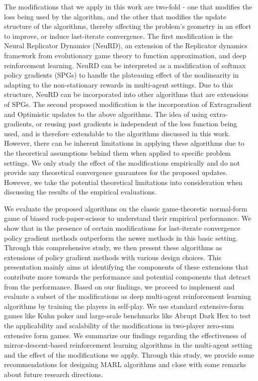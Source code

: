 The modifications that we apply in this work are two-fold - one that modifies the loss being used
by the algorithm, and the other that modifies the update structure of the algorithms, thereby
affecting the problem's geometry in an effort to improve, or induce last-iterate convergence.
The first modification is the Neural Replicator Dynamics (NeuRD), an extension of the Replicator
dynamics framework from evolutionary game theory to function approximation, and deep reinforcement
learning.
NeuRD can be interpreted as a modification of softmax policy gradients (SPGs) to handle the
plateauing effect of the nonlinearity in adapting to the non-stationary rewards in multi-agent
settings.
Due to this structure, NeuRD can be incorporated into other algorithms that are extensions of SPGs.
The second proposed modification is the incorporation of Extragradient and Optimistic updates to
the above algorithms.
The idea of using extra-gradients, or reusing past gradients is independent of the loss function
being used, and is therefore extendable to the algorithms discussed in this work.
However, there can be inherent limitations in applying these algorithms due to the theoretical
assumptions behind them when applied to specific problem settings.
We only study the effect of the modifications empirically and do not provide any theoretical
convergence guarantees for the proposed updates.
However, we take the potential theoretical limitations into consideration when discussing the
results of the empirical evaluations.

We evaluate the proposed algorithms on the classic game-theoretic normal-form game of biased
rock-paper-scissor to understand their empirical performance.
We show that in the presence of certain modifications for last-iterate convergence policy gradient
methods outperform the newer methods in this basic setting.
Through this comprehensive study, we then present these algorithms as extensions of policy gradient
methods with various design choices.
This presentation mainly aims at identifying the components of these extensions that contribute
more towards the performance and potential components that detract from the performance.
Based on our findings, we proceed to implement and evaluate a subset of the modifications as deep
multi-agent reinforcement learning algorithms by training the players in self-play.
We use standard extensive-form games like Kuhn poker and large-scale benchmarks like Abrupt Dark
Hex to test the applicability and scalability of the modifications in two-player zero-sum extensive
form games.
We summarize our findings regarding the effectiveness of mirror-descent-based reinforcement
learning algorithms in the multi-agent setting and the effect of the modifications we apply.
Through this study, we provide some recommendations for designing MARL algorithms and close with
some remarks about future research directions.
